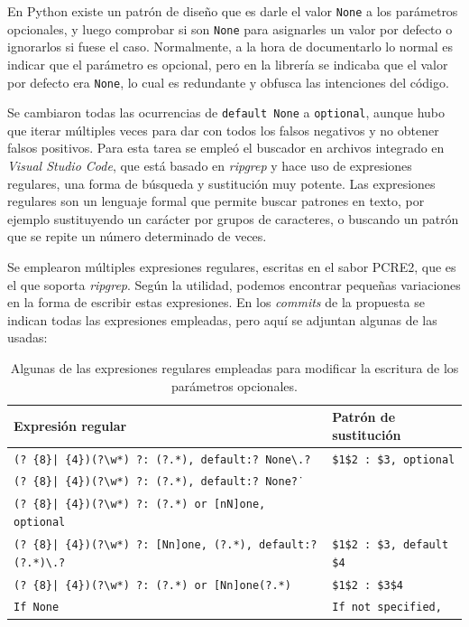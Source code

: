 En Python existe un patrón de diseño que es darle el valor \texttt{None} a los parámetros opcionales, y luego comprobar si son \texttt{None} para asignarles un valor por defecto o ignorarlos si fuese el caso. Normalmente, a la hora de documentarlo lo normal es indicar que el parámetro es opcional, pero en la librería se indicaba que el valor por defecto era \texttt{None}, lo cual es redundante y obfusca las intenciones del código.

Se cambiaron todas las ocurrencias de \texttt{default None} a \texttt{optional}, aunque hubo que iterar múltiples veces para dar con todos los falsos negativos y no obtener falsos positivos. Para esta tarea se empleó el buscador en archivos integrado en \textit{Visual Studio Code}, que está basado en \textit{ripgrep} y hace uso de expresiones regulares, una forma de búsqueda y sustitución muy potente. Las expresiones regulares son un lenguaje formal que permite buscar patrones en texto, por ejemplo sustituyendo un carácter por grupos de caracteres, o buscando un patrón que se repite un número determinado de veces.

Se emplearon múltiples expresiones regulares, escritas en el sabor PCRE2, que es el que soporta \textit{ripgrep}. Según la utilidad, podemos encontrar pequeñas variaciones en la forma de escribir estas expresiones. En los \textit{commits} de la propuesta se indican todas las expresiones empleadas, pero aquí se adjuntan algunas de las usadas:

\begin{table}[H]
    \centering
    \begin{adjustbox}{max width=\textwidth}
    \begin{tabular}{l|l}
        Expresión regular & Patrón de sustitución \\
        \hline
        \texttt{(? \{8\}| \{4\})(?\textbackslash{}w*) ?: (?.*), default:? None\textbackslash{}.?} & \texttt{\$1\$2 : \$3, optional} \\
        \texttt{(? \{8\}| \{4\})(?\textbackslash{}w*) ?: (?.*), default:? None\.?} & \\
        \texttt{(? \{8\}| \{4\})(?\textbackslash{}w*) ?: (?.*) or {[}nN{]}one, optional} & \\
        \hline
        \texttt{(? \{8\}| \{4\})(?\textbackslash{}w*) ?: {[}Nn{]}one, (?.*), default:? (?.*)\textbackslash{}.?} & \texttt{\$1\$2 : \$3, default \$4} \\
        \hline
        \texttt{(? \{8\}| \{4\})(?\textbackslash{}w*) ?: (?.*) or {[}Nn{]}one(?.*)} & \texttt{\$1\$2 : \$3\$4} \\
        \hline
        \texttt{If None} & \texttt{If not specified,} \\
    \end{tabular}
    \end{adjustbox}
    \caption{Algunas de las expresiones regulares empleadas para modificar la escritura de los parámetros opcionales.}
    \label{tab:expresiones_regulares_default_none}
\end{table}

